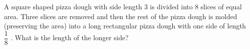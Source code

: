 A square shaped pizza dough with side length $3$ is divided into $8$ slices of equal area. Three slices are removed and then the rest of the pizza dough is molded (preserving the area) into a long rectangular pizza dough with one side of length $\dfrac{1}{8}$ . What is the length of the longer side?
